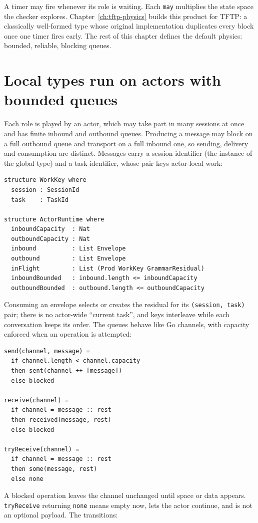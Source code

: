 A timer may fire whenever its role is waiting. Each \texttt{may} multiplies the
state space the checker explores. Chapter~\ref{ch:tftp-physics} builds this
product for TFTP: a classically well-formed type whose original implementation
duplicates every block once one timer fires early. The rest of this chapter
defines the default physics: bounded, reliable, blocking queues.

\section{Local types run on actors with bounded queues}

Each role is played by an actor, which may take part in many sessions at once and
has finite inbound and outbound queues. Producing a message may block on a full
outbound queue and transport on a full inbound one, so sending, delivery and
consumption are distinct. Messages carry a session identifier (the instance of the
global type) and a task identifier, whose pair keys actor-local work:

\begin{lstlisting}
structure WorkKey where
  session : SessionId
  task    : TaskId

structure ActorRuntime where
  inboundCapacity  : Nat
  outboundCapacity : Nat
  inbound          : List Envelope
  outbound         : List Envelope
  inFlight         : List (Prod WorkKey GrammarResidual)
  inboundBounded   : inbound.length <= inboundCapacity
  outboundBounded  : outbound.length <= outboundCapacity
\end{lstlisting}

Consuming an envelope selects or creates the residual for its
\texttt{(session, task)} pair; there is no actor-wide ``current task'', and keys
interleave while each conversation keeps its order. The queues behave like Go
channels, with capacity enforced when an operation is attempted:

\begin{lstlisting}
send(channel, message) =
  if channel.length < channel.capacity
  then sent(channel ++ [message])
  else blocked

receive(channel) =
  if channel = message :: rest
  then received(message, rest)
  else blocked

tryReceive(channel) =
  if channel = message :: rest
  then some(message, rest)
  else none
\end{lstlisting}

A blocked operation leaves the channel unchanged until space or data appears.
\texttt{tryReceive} returning \texttt{none} means empty now, lets the actor
continue, and is not an optional payload. The transitions:

